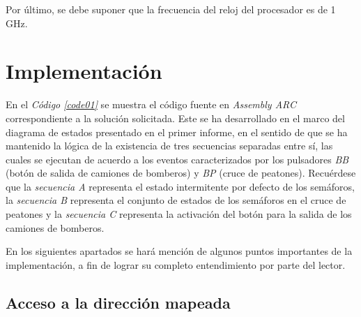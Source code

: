 \documentclass{article}
\newcommand{\refcode}[1]{\textit{Código \ref{#1}}}
\begin{document}
	Por último, se debe suponer que la frecuencia del reloj del procesador es de 1 GHz.




\section{Implementación}
\medskip

	En el \refcode{code01} se muestra el código fuente en \textit{Assembly ARC} correspondiente a la solución solicitada. Este se ha desarrollado en el marco del diagrama de estados presentado en el primer informe, en el sentido de que se ha mantenido la lógica de la existencia de tres secuencias separadas entre sí, las cuales se ejecutan de acuerdo a los eventos caracterizados por los pulsadores \textit{BB} (botón de salida de camiones de bomberos) y \textit{BP} (cruce de peatones). Recuérdese que la \textit{secuencia A} representa el estado intermitente por defecto de los semáforos, la \textit{secuencia B} representa el conjunto de estados de los semáforos en el cruce de peatones y la \textit{secuencia C} representa la activación del botón para la salida de los camiones de bomberos.
\bigskip


\lstset{language=[ARC]Assembler} %
 
\bigskip\bigskip\bigskip





	En los siguientes apartados se hará mención de algunos puntos importantes de la implementación, a fin de lograr su completo entendimiento por parte del lector.
\bigskip\bigskip



\subsection{Acceso a la dirección mapeada}
\medskip
	
\end{document}
